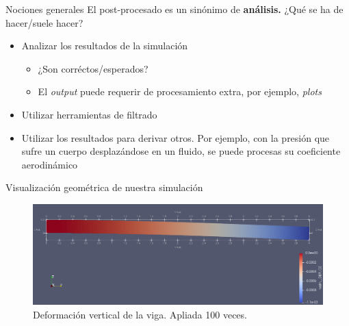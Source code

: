 \documentclass[12pt]{beamer}
\begin{document}
\begin{frame}{Nociones generales}
	El post-procesado es un sinónimo de \textbf{análisis.} ¿Qué se ha de hacer/suele hacer? 
	\begin{itemize}
		\item Analizar los resultados de la simulación
		\begin{itemize}
			\item ¿Son corréctos/esperados?
			\item El \textit{output} puede requerir de procesamiento extra, por ejemplo, \textit{plots}
		\end{itemize}
		\item Utilizar herramientas de filtrado
		\item Utilizar los resultados para derivar otros. Por ejemplo, con la presión que sufre un cuerpo desplazándose en un fluido, se puede procesas su coeficiente aerodinámico
	\end{itemize}
\end{frame}

\begin{frame}{Visualización geométrica de nuestra simulación}
	\begin{figure}
		\centering
		\hspace*{-1em}\includegraphics[width=1.1\linewidth]{3dview}
		\caption{Deformación vertical de la viga. Apliada 100 veces.}
		\label{fig:3dview}
	\end{figure}
\end{frame}
\end{document}
